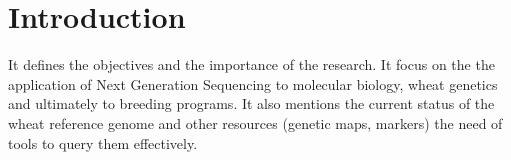 
\chapter{Introduction}

It defines the objectives and the importance of the research. It focus on the the application of Next Generation Sequencing to molecular biology, wheat genetics and ultimately to breeding programs. It also mentions the current status of the wheat reference genome and other resources (genetic maps, markers) the need of tools to query them effectively. 

